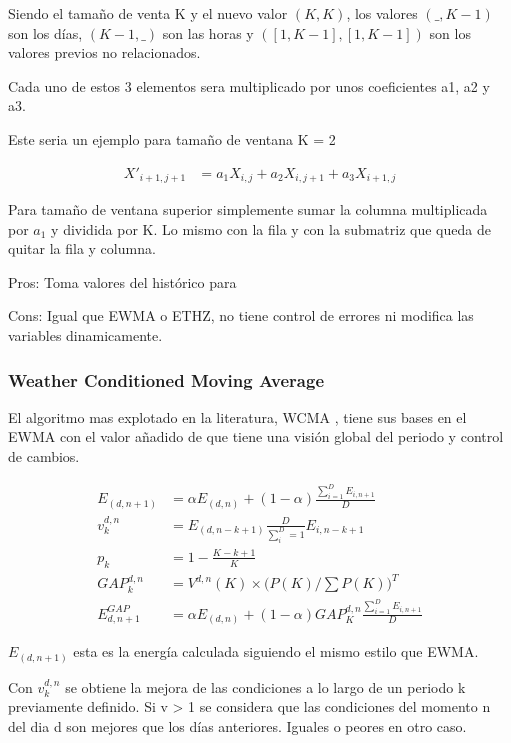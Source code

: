 Siendo el tamaño de venta K y el nuevo valor $(K,K)$, los valores $(\_,K-1)$ son los días, $(K-1,\_)$ son las horas y $([1,K-1],[1,K-1])$ son los valores previos no relacionados. 

Cada uno de estos 3 elementos sera multiplicado por unos coeficientes a1, a2 y a3. 

Este seria un ejemplo para tamaño de ventana K = 2

\begin{align}
	X'_{i+1,j+1} &= a_1 X_{i,j} + a_2 X_{i,j+1} + a_3 X_{i+1,j}
\end{align}

Para tamaño de ventana superior simplemente sumar la columna multiplicada por $a_1$ y dividida por K. Lo mismo con la fila y con la submatriz que queda de quitar la fila y columna.

Pros: Toma valores del histórico para

Cons: Igual que EWMA o ETHZ, no tiene control de errores ni modifica las variables dinamicamente.


\subsubsection{ Weather Conditioned Moving Average} 
\label{ssub:subsubsection_name}

El algoritmo mas explotado en la literatura, WCMA \cite{ewma}, tiene sus bases en el EWMA con el valor añadido de que tiene una visión global del periodo y control de cambios.

\begin{align}
	E_{(d,n+1)} &= \alpha E_{(d,n)} + (1-\alpha) \frac  {\sum_{i=1}^D E_{i,n+1}} {D} \\
	v^{d,n}_k &= E_{(d,n-k+1)} \frac {D}{\sum^D_i=1} E_{i,n-k+1} \\
	p_k &= 1-\frac {K-k+1}{K} \\
	GAP_k^{d,n} &= V^{d,n}(K) \times \big(P(K) / \sum P(K) \big)^T \\
	E^{GAP}_{d,n+1} &= \alpha E_(d,n) + (1-\alpha) GAP_K^{d,n} \frac{\sum^D_{i=1} E_{i,n+1}}{D}
\end{align}

$E_{(d,n+1)}$ esta es la energía calculada siguiendo el mismo estilo que EWMA. 

Con $v^{d,n}_k$ se obtiene la mejora de las condiciones a lo largo de un periodo k previamente definido. Si v > 1 se considera que las condiciones del momento n del dia d son mejores que los días anteriores. Iguales o peores en otro caso.

